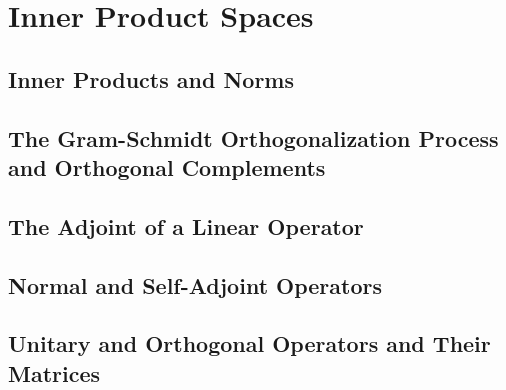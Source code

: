 \setcounter{chapter}{5}
\chapter{Inner Product Spaces}
\thispagestyle{empty}
\newpage

\section{Inner Products and Norms}



\vspace{12pt}

\setcounter{Exercise}{3}


\vspace{12pt}

\setcounter{Exercise}{7}


\vspace{12pt}



\vspace{12pt}

\setcounter{Exercise}{10}


\vspace{12pt}




\section{The Gram-Schmidt Orthogonalization Process and Orthogonal Complements}


\section{The Adjoint of a Linear Operator}


\section{Normal and Self-Adjoint Operators}


\section{Unitary and Orthogonal Operators and Their
Matrices}


